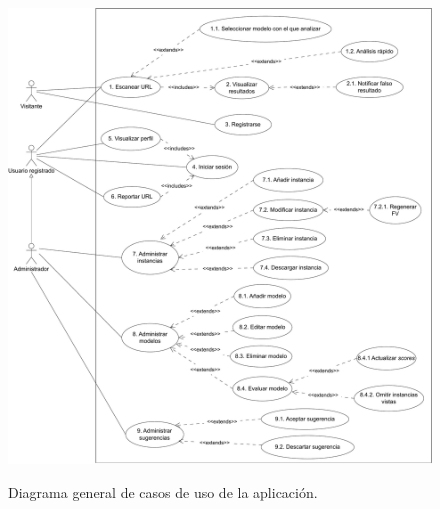\begin{figure}[h]
	\caption[Diagrama: casos de uso]{Diagrama general de casos de uso de la aplicación.}
	\centering
	\includegraphics[width=\textwidth]{../img/anexos/diagrams/cu}
	\label{b:diagrama-cu}
\end{figure}

